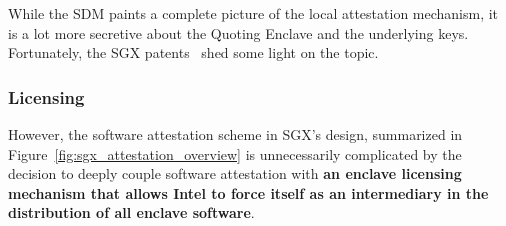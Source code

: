 While the SDM paints a complete picture of the local attestation mechanism, it
is a lot more secretive about the Quoting Enclave and the underlying keys.
Fortunately, the SGX patents~\cite{intel2013patent1, intel2013patent2} shed
some light on the topic.



\subsubsection{Licensing}
\label{sec:sgx_licensing}

However, the software attestation scheme in SGX's design, summarized in
Figure~\ref{fig:sgx_attestation_overview} is unnecessarily complicated by the
decision to deeply couple software attestation with
\textbf{an enclave licensing mechanism that allows Intel to force itself as an
intermediary in the distribution of all enclave software}.

